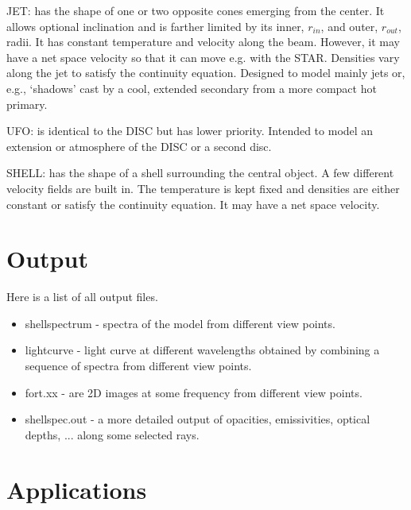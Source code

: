 \documentclass[11pt,twoside]{article}
\begin{document}
JET:
has the shape of one or two opposite cones emerging from the center.
It allows optional inclination and is farther limited by its inner, 
$r_{in}$, and outer, $r_{out}$, radii. It has constant temperature and
velocity along the beam. However, it may have a net space velocity so 
that it can move e.g. with the STAR. 
Densities vary along the jet to satisfy the continuity equation.
Designed to model mainly jets or, 
e.g., `shadows' cast by a cool, extended secondary from a more compact 
hot primary.

UFO:
is identical to the DISC but has lower priority. 
Intended to model an extension or atmosphere of 
the DISC or a second disc.

SHELL:
has the shape of a shell surrounding the central object. 
A few different velocity fields are built in.
The temperature is kept fixed and densities are either constant
or satisfy the continuity equation. It may have a net space velocity.


\section{Output}

Here is a list of all output files.
\begin{itemize}
\item
shellspectrum - spectra of the model from different view points.
\item
lightcurve - light curve at different wavelengths obtained by combining
a sequence of spectra from different view points.
\item
fort.xx - are 2D images at some frequency from different view points.
\item
shellspec.out - a more detailed output of opacities, emissivities, 
optical depths, ... along some selected rays.
\end{itemize}


\section{Applications}
\end{document}
